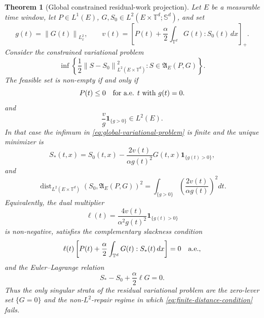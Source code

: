 \documentclass[11pt]{article}
\numberwithin{equation}{section}
\newtheorem{theorem}{Theorem}[section]
\newcommand{\T}{\mathbb T}
\newcommand{\Sym}{\mathbb S}
\newcommand{\norm}[1]{\left\lVert #1\right\rVert}
\begin{document}
\begin{theorem}[Global constrained residual-work projection]
\label{thm:global-variational-projection}
Let \(E\) be a measurable time window, let \(P\in L^1(E)\),
\(G,S_0\in L^2(E\times\T^d;\Sym^d)\), and set
\[
  g(t)=\norm{G(t)}_{L^2_x},\qquad
  v(t)=
  \left[
  P(t)+\frac{\alpha}{2}\int_{\T^d}G(t):S_0(t)\,dx
  \right]_+ .
\]
Consider the constrained variational problem
\begin{equation}
  \inf\left\{
  \frac12\norm{S-S_0}_{L^2(E\times\T^d)}^2:
  S\in\mathfrak A_E(P,G)
  \right\}.
  \label{eq:global-variational-problem}
\end{equation}
The feasible set is non-empty if and only if
\[
  P(t)\le0\quad\hbox{for a.e. }t\hbox{ with }g(t)=0.
  \label{eq:zero-lever-feasible}
\]
and
\[
  \frac{v}{g}\mathbf 1_{\{g>0\}}\in L^2(E).
  \label{eq:finite-distance-condition}
\]
In that case the infimum in \eqref{eq:global-variational-problem} is finite and
the unique minimizer is
\begin{equation}
  S_*(t,x)
  =
  S_0(t,x)
  -
  \frac{2v(t)}{\alpha g(t)^2}G(t,x)\mathbf 1_{\{g(t)>0\}},
  \label{eq:global-projection-formula}
\end{equation}
and
\[
  \operatorname{dist}_{L^2(E\times\T^d)}
  (S_0,\mathfrak A_E(P,G))^2
  =
  \int_{\{g>0\}}
  \left(\frac{2v(t)}{\alpha g(t)}\right)^2dt .
\]
Equivalently, the dual multiplier
\[
  \ell(t)=
  \frac{4v(t)}{\alpha^2g(t)^2}\mathbf 1_{\{g(t)>0\}}
\]
is non-negative, satisfies the complementary slackness condition
\[
  \ell(t)
  \left[
  P(t)+\frac{\alpha}{2}\int_{\T^d}G(t):S_*(t)\,dx
  \right]=0
  \quad\hbox{a.e.},
\]
and the Euler--Lagrange relation
\[
  S_*-S_0+\frac{\alpha}{2}\ell G=0 .
\]
Thus the only singular strata of the residual variational problem are the
zero-lever set \(\{G=0\}\) and the non-\(L^2\)-repair regime in which
\eqref{eq:finite-distance-condition} fails.
\end{theorem}
\end{document}
